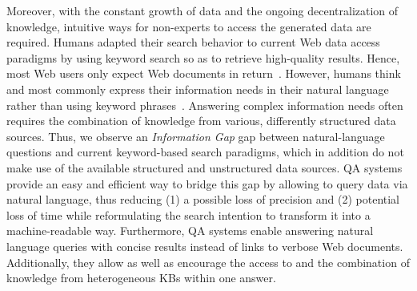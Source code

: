 Moreover, with the constant growth of data and the ongoing decentralization of knowledge, intuitive ways for non-experts to access the generated data are required. 
Humans adapted their search behavior to current Web data access paradigms by using keyword search so as to retrieve high-quality results. Hence, most Web users only expect Web documents in return~\cite{ilprints361}.
However, humans think and most commonly express their information needs  in their natural language rather than using keyword phrases~\cite{woods1973progress}. 
Answering complex information needs often requires the combination of knowledge from various, differently structured data sources.
Thus, we observe an \emph{Information Gap} gap between natural-language questions and current keyword-based search paradigms, which in addition do not make use of the available structured and unstructured data sources.
\ac{QA} systems provide an easy and efficient way to bridge this gap by allowing to query data via natural language, thus reducing (1) a possible loss of precision and (2) potential loss of time while reformulating the search intention to transform it into a machine-readable way.
Furthermore, QA systems enable answering natural language queries with concise results instead of  links to verbose Web documents. 
Additionally, they allow as well as encourage the access  to and the combination of knowledge from heterogeneous \ac{KB}s within one answer.

